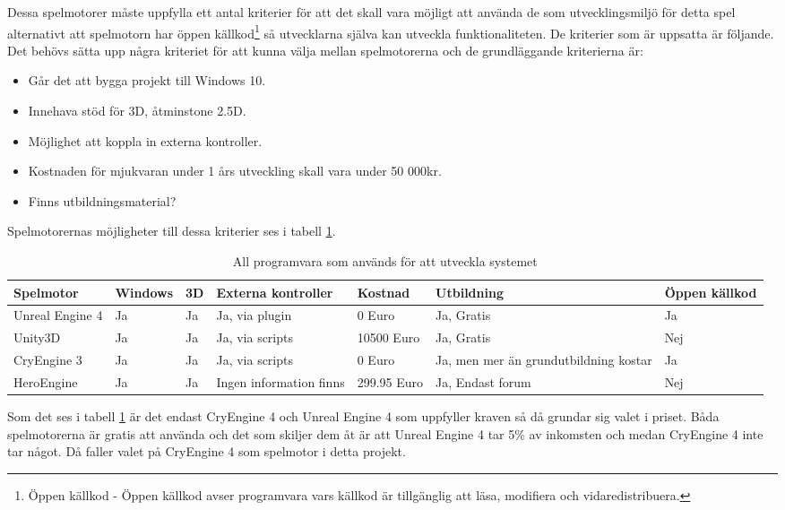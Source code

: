 \documentclass[a4paper,12pt,oneside,final]{extbook}
\begin{document}
Dessa spelmotorer måste uppfylla ett antal kriterier för att det skall vara möjligt att använda de som utvecklingsmiljö för detta spel alternativt att spelmotorn har öppen källkod\footnote{Öppen källkod - Öppen källkod avser programvara vars källkod är tillgänglig att läsa, modifiera och vidaredistribuera. } så utvecklarna själva kan utveckla funktionaliteten. De kriterier som är uppsatta är följande.
Det behövs sätta upp några kriteriet för att kunna välja mellan spelmotorerna och de grundläggande kriterierna är:
\begin{itemize}
	\item Går det att bygga projekt till Windows 10.
	\item Innehava stöd för 3D, åtminstone 2.5D.
	\item Möjlighet att koppla in externa kontroller.
	\item Kostnaden för mjukvaran under 1 års utveckling skall vara under 50 000kr.
	\item Finns utbildningsmaterial?
	
\end{itemize}
Spelmotorernas möjligheter till dessa kriterier ses i tabell \ref{Spelmotorer}.

\begin{table}[h]
	\centering
	\caption{All programvara som används för att utveckla systemet}
	\label{Spelmotorer}
	\begin{tabular}{ | p{6em} | m{4em} |p{1em}| p{8em} |p{5em} |p{7em} |p{4em} |} 
		\hline
		\textbf{Spelmotor}&\textbf{Windows}  &\textbf{3D}&\textbf{Externa kontroller}&\textbf{Kostnad}&\textbf{Utbildning} &\textbf{Öppen källkod}\\ 
		\hline
		Unreal Engine 4 & Ja&Ja & Ja, via plugin&0 Euro\cite{Unreal}&Ja, Gratis& Ja  \\ 
		\hline
		Unity3D &Ja &Ja&Ja, via scripts&10500 Euro\cite{Unity}&Ja, Gratis & Nej\\ 
		\hline
		CryEngine 3 &Ja& Ja &Ja, via scripts &0 Euro\cite{CryEngine}&Ja, men mer än grundutbildning kostar& Ja \\ 
		\hline
		HeroEngine &Ja&Ja &Ingen information finns&299.95 Euro\cite{HeroEngine}& Ja, Endast forum & Nej\\ 
		\hline
		
	\end{tabular}
\end{table}

Som det ses i tabell \ref{Spelmotorer} är det endast CryEngine 4 och Unreal Engine 4 som uppfyller kraven så då grundar sig valet i priset. Båda spelmotorerna är gratis att använda och det som skiljer dem åt är att Unreal Engine 4 tar 5\% av inkomsten och medan CryEngine 4 inte tar något. Då faller valet på CryEngine 4 som spelmotor i detta projekt.
\end{document}
